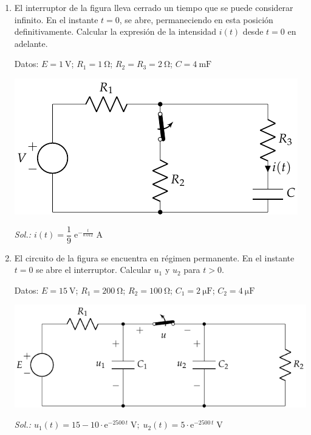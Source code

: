 \begin{enumerate}
\item El interruptor de la figura lleva cerrado un tiempo que se puede
  considerar infinito. En el instante $t=0$, se abre, permaneciendo en
  esta posición definitivamente. Calcular la expresión de la
  intensidad $i(t)$ desde $t=0$ en adelante.  
  
  Datos:\;
  $E = \qty{1}{\volt}$;\; $R_1 = \qty{1}{\ohm}$;\;
  $R_2 = R_3 = \qty{2}{\ohm}$;\; $C = \qty{4}{\milli\farad}$

  \begin{center}
    \includegraphics{../figs/BT4_01.pdf}
  \end{center}

  \emph{Sol.:\; $i(t)=\dfrac{1}{9}\; \mathrm{e}^{-\frac{t}{0.012}} \;\si{\ampere}$}
  
\item El circuito de la figura se encuentra en régimen permanente. En
  el instante $t=0$ se abre el interruptor. Calcular $u_1$ y $u_2$
  para $t>0$.

  Datos:\; $E = \qty{15}{\volt}$;\; $R_1 = \qty{200}{\ohm}$;\;
  $R_2 = \qty{100}{\ohm}$;\; $C_1 = \qty{2}{\micro\farad}$;\;
  $C_2 = \qty{4}{\micro\farad}$

  \begin{center}
    \includegraphics{../figs/BT4_02.pdf}
  \end{center}

  \emph{Sol.:\;
    $u_1(t)=15-10\cdot\mathrm{e}^{-2500\,t}\;\si{\volt};\;
    u_2(t)=5\cdot\mathrm{e}^{-2500\,t}\;\si{\volt}$}
  

\end{enumerate}
